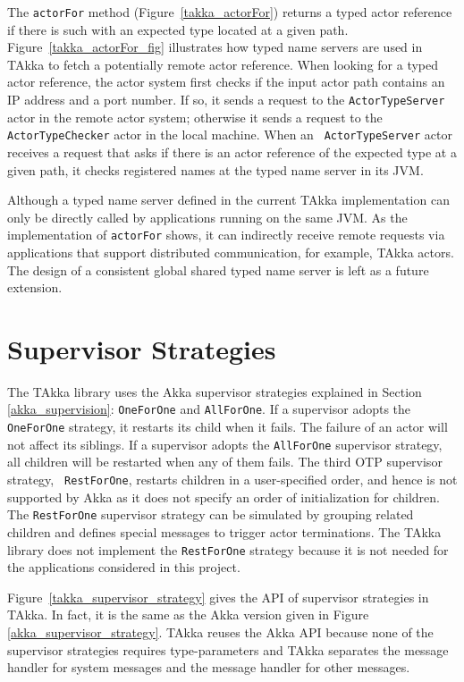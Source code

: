 The {\tt actorFor} method (Figure~\ref{takka_actorFor}) returns a typed actor reference if there is such with 
an expected type located at a given path.  Figure~\ref{takka_actorFor_fig} illustrates how typed name servers 
are used in TAkka to fetch a potentially remote actor reference.  When looking for a typed 
actor reference, the actor system first checks if the input actor path 
contains an IP address and a port number.  If so, it sends a request to the 
{\tt ActorTypeServer} actor in the remote actor system; otherwise it sends a 
request to the {\tt ActorTypeChecker} actor in the local machine.  When an {\tt 
ActorTypeServer} actor receives a request that asks if there is an actor 
reference of the expected type at a given path,
it checks registered names at the typed name server in its JVM.  


Although a typed name server defined in the current TAkka implementation can 
only be directly called by applications running on the same JVM.  As the 
implementation of {\tt actorFor} shows, it can indirectly receive remote 
requests via applications that support distributed communication, for example, 
TAkka actors.  The design of a consistent global shared typed name server is 
left as a future extension.



\section{Supervisor Strategies}
\label{supervision}

The TAkka library uses the Akka supervisor strategies explained in Section 
\ref{akka_supervision}: {\tt OneForOne} and {\tt AllForOne}.  If a supervisor 
adopts the {\tt OneForOne} strategy, it restarts its child when it fails.  
The failure of an actor will not affect its siblings.  If a supervisor adopts 
the {\tt AllForOne} supervisor strategy, all children will 
be restarted when any of them fails.  The third OTP supervisor strategy, {\tt
RestForOne}, restarts children in a user-specified order, and hence is not
supported by Akka as it does not specify an order of initialization for
children.  The {\tt RestForOne} supervisor strategy can be simulated by 
grouping related children and defines special messages to trigger actor 
terminations.  The TAkka library does not implement the {\tt RestForOne} 
strategy because it is not needed for the applications considered in this 
project.

Figure~\ref{takka_supervisor_strategy} gives the API of supervisor strategies in 
TAkka.  In fact, it is the same as the Akka version given in Figure 
\ref{akka_supervisor_strategy}.  TAkka reuses the Akka API because none of the 
supervisor strategies requires type-parameters and TAkka separates 
the message handler for system messages and the message handler for other 
messages.





